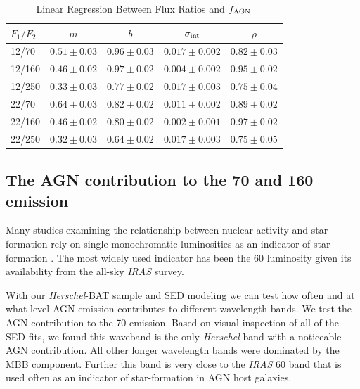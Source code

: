 \documentclass[fleqn, usenatbib]{mnras}
\newcommand{\herschel}{\emph{Herschel}}
\begin{document}
\begin{table}
\begin{threeparttable}
\captionsetup{font=small,labelfont=bf,labelsep=period}
\caption{Linear Regression Between Flux Ratios and $f_{\rm AGN}$\label{tab:flux_ratio_fagn_linreg}}
\begin{tabular}{lcccc}
\toprule 
$F_{1}/F_{2}$ & $m$ & $b$  & $\sigma_{\rm int}$ & $\rho$  \\
\midrule
12/70      & $0.51\pm0.03$ & $0.96\pm0.03$ & $0.017\pm0.002$ & $0.82\pm0.03$ \\
12/160    & $0.46\pm0.02$ & $0.97\pm0.02$ & $0.004\pm0.002$ & $0.95\pm0.02$ \\
12/250    & $0.33\pm0.03$ & $0.77\pm0.02$ & $0.017\pm0.003$ & $0.75\pm0.04$ \\
22/70      & $0.64\pm0.03$ & $0.82\pm0.02$ & $0.011\pm0.002$ & $0.89\pm0.02$ \\
22/160    & $0.46\pm0.02$ & $0.80\pm0.02$ & $0.002\pm0.001$ & $0.97\pm0.02$ \\
22/250    & $0.32\pm0.03$ & $0.64\pm0.02$ & $0.017\pm0.003$ & $0.75\pm0.05$ \\
\bottomrule
\end{tabular}
\end{threeparttable}
\end{table}

\subsection{The AGN contribution to the 70 and 160 \micron emission}
Many studies examining the relationship between nuclear activity and star formation rely on single monochromatic luminosities as an indicator of star formation \cite[e.g.][]{Netzer:2007ve, Netzer:2009lr, Rosario:2012fr, Zakamska:2016lr}. The most widely used indicator has been the 60 \micron{} luminosity given its availability from the all-sky \textit{IRAS} survey. 

With our \herschel-BAT sample and SED modeling we can test how often and at what level AGN emission contributes to different wavelength bands. We test the AGN contribution to the 70 \micron{} emission. Based on visual inspection of all of the SED fits, we found this waveband is the only \herschel{} band with a noticeable AGN contribution. All other longer wavelength bands were dominated by the MBB component. Further this band is very close to the \textit{IRAS} 60 \micron{} band that is used often as an indicator of star-formation in AGN host galaxies.
\end{document}
